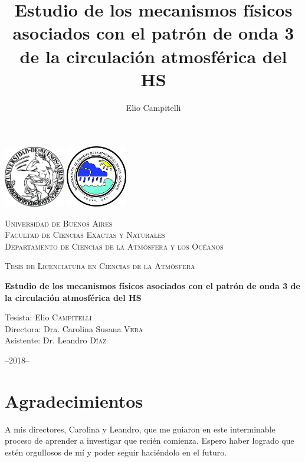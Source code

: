 \documentclass[spanish,a4paper,12pt,oneside]{book}
\title{Estudio de los mecanismos físicos asociados con el patrón de onda 3 de
la circulación atmosférica del HS}
\author{Elio Campitelli}
\date{}
\begin{document}
\maketitle

\frontmatter

\begin{titlepage}
\centering
\includegraphics[width=0.2\textwidth]{logoUBA}  \hfill \includegraphics[width=0.2\textwidth]{logoDCAO} \par
\vspace{0.5cm}
{\scshape\LARGE Universidad de Buenos Aires  \\
\large Facultad de Ciencias Exactas y Naturales \\
Departamento de Ciencias de la Atmósfera y los Océanos  \par}
\vspace{0.5cm}
{\scshape\Large Tesis de Licenciatura en Ciencias de la Atmósfera\par}
\vspace{1cm}
{\huge\bfseries Estudio de los mecanismos físicos asociados con el patrón de onda 3 de la circulación atmosférica del HS\par}
\vspace{1.5cm}
{\Large Tesista: Elio \textsc{Campitelli} \\
Directora:  Dra. Carolina Susana \textsc{Vera} \\
Asistente: Dr. Leandro \textsc{Díaz}
\par}
\vfill

{\large --2018--\par}
\end{titlepage}

\chapter*{Agradecimientos}

A mis directores, Carolina y Leandro, que me guiaron en este
interminable proceso de aprender a investigar que recién comienza.
Espero haber logrado que estén orgullosos de mí y poder seguir
haciéndolo en el futuro.
\end{document}
